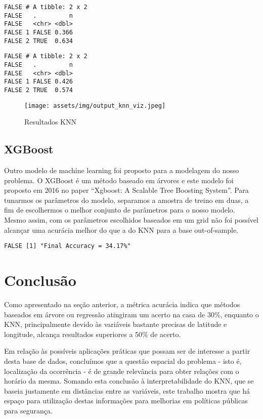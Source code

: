 \documentclass[
  12pt,
]{report}
\begin{document}
\begin{verbatim}
FALSE # A tibble: 2 x 2
FALSE   .         n
FALSE   <chr> <dbl>
FALSE 1 FALSE 0.366
FALSE 2 TRUE  0.634
\end{verbatim}

\begin{verbatim}
FALSE # A tibble: 2 x 2
FALSE   .         n
FALSE   <chr> <dbl>
FALSE 1 FALSE 0.426
FALSE 2 TRUE  0.574
\end{verbatim}

\begin{figure}
\centering
\texttt{[image: assets/img/output\_knn\_viz.jpeg]}
\caption{Resultados KNN}
\end{figure}

\hypertarget{xgboost-1}{%
\section{XGBoost}\label{xgboost-1}}

Outro modelo de machine learning foi proposto para a modelagem do nosso problema. O XGBoost é um método baseado em árvores e este modelo foi proposto em 2016 no paper ``Xgboost: A Scalable Tree Boosting System''. Para tunarmos os parâmetros do modelo, separamos a amostra de treino em duas, a fim de escolhermos o melhor conjunto de parâmetros para o nosso modelo. Mesmo assim, com os parâmetros escolhidos baseados em um grid não foi possível alcançar uma acurácia melhor do que a do KNN para a base out-of-sample.

\begin{verbatim}
FALSE [1] "Final Accuracy = 34.17%"
\end{verbatim}

\hypertarget{conclusao}{%
\chapter{Conclusão}\label{conclusao}}

Como apresentado na seção anterior, a métrica acurácia indica que métodos baseados em árvore ou regressão atingiram um acerto na casa de 30\%, enquanto o KNN, principalmente devido às variáveis bastante precisas de latitude e longitude, alcança resultados superiores a 50\% de acerto.

Em relação às possíveis aplicações práticas que possam ser de interesse a partir desta base de dados, concluímos que a questão espacial do problema - isto é, localização da ocorrência - é de grande relevância para obter relações com o horário da mesma. Somando esta conclusão à interpretabilidade do KNN, que se baseia justamente em distâncias entre as variáveis, este trabalho mostra que há espaço para utilização destas informações para melhorias em políticas públicas para segurança.

  
\end{document}
